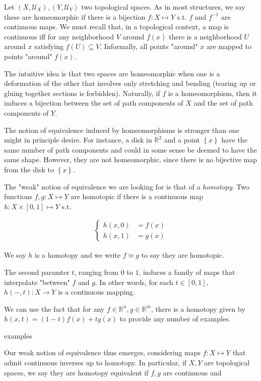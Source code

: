 \documentclass[a4paper, 12pt]{article}
\begin{document}
Let $(X, \mathcal{U}_X), (Y, \mathcal{U}_Y)$ two topological spaces. As in most
structures, we say these are homeomorphic if there is a bijection $f : X
\mapsto Y$ s.t. $f$ and $f^{-1}$ are continuous maps. We must recall that, in a
topological context, a map is continuous iff for any neighborhood 
$V$ around $f(x)$ there is a neighborhood $U$ around $x$ satisfying 
$f(U) \subseteq V$. Informally, all points "around" $x$ are mapped to 
points "around" $f(x)$. 

The intuitive idea is that two spaces are homeomorphic when one 
is a deformation of the other that involves only stretching and 
bending (tearing up or gluing together sections is forbidden). Naturally, if
$f$ is a homeomorphism, then it induces a bijection between the set of path
components of $X$ and the set of path components of $Y$.

The notion of equivalence induced by homeomorphisms is stronger than one might
in principle desire. For instance, a disk in $\mathbb{R}^2$ and a point
$\left\{ x \right\} $ have the same number of path components and could in some
sense be deemed to have the same shape. However, they are not homeomorphic,
since there is no bijective map from the disk to $\left\{ x \right\} $.

The "weak" notion of equivalence we are looking for is that of a \textit{homotopy}.
Two functions $f, g : X \mapsto Y$ are homotopic if there is a continuous map 
$h : X \times [0, 1] \mapsto Y$ s.t. 

\begin{align*}
    \begin{cases}
        h(x, 0) &= f(x)\\ 
        h(x, 1) &= g(x)
    \end{cases}
\end{align*}

We say $h$ is a homotopy and we write $f \simeq g$ to say they are homotopic. 

The second paramter $t$, ranging from $0$ to $1$, induces a family of maps 
that interpolate "between" $f$ and $g$. In other words, for each $t \in [0, 1]$,
$h(-, t) : X \to Y$ is a continuous mapping. 

We can use the fact that for any $f \in \mathbb{R}^n, g \in \mathbb{R}^m$, there is 
a homotopy given by $h(x, t) = (1 - t)f(x) + t g(x)$ to provide 
any number of examples.

examples 


Our weak notion of equivalence thus emerges, considering maps $f : X \mapsto Y$
that admit continuous inverses up to homotopy. In particular, if $X, Y$
are topological spaces, we say they are homotopy equivalent if $f, g$ 
are continuous and
\end{document}

